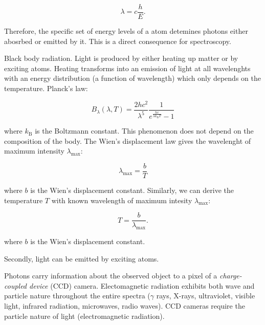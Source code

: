 \begin{equation}
	\lambda = c \frac{h}{E}.
\end{equation}

Therefore, the specific set of energy levels of a atom detemines photons either abosrbed or emitted by it.
This is a direct consequence for spectroscopy.~\cite{cochard2018}

Black body radiation.
Light is produced by either heating up matter or by exciting atoms.
Heating transforms into an emission of light at all wavelenghts with an energy distribution (a function of wavelength) which only depends on the temperature.
Planck's law:

\begin{equation}
	B_{\lambda}(\lambda, T) = \frac{2 h c^2}{\lambda^5} \frac{1}{e^{\frac{hc}{\lambda k_{\mathrm{B}}T}} - 1}
\end{equation}

where \(k_{\mathrm{B}}\) is the Boltzmann constant.
This phenomenon does not depend on the composition of the body.
The Wien's displacement law gives the wavelenght of maximum intensity \(\lambda_{\max}\):

\begin{equation}
	\lambda_{\max} = \frac{b}{T}
\end{equation}

where \(b\) is the Wien's displacement constant.
Similarly, we can derive the temperature \(T\) with known wavelength of maximum intesity \(\lambda_{\max}\):

\begin{equation}
	T = \frac{b}{\lambda_{\max}}.
\end{equation}

where \(b\) is the Wien's displacement constant.~\cite{cochard2018}

Secondly, light can be emitted by exciting atoms.

Photons carry information about the observed object to a pixel of a \textit{charge-coupled device} (CCD) camera.
Electomagnetic radiation exhibits both wave and particle nature throughout the entire spectra
(\(\gamma\) rays, X-rays, ultraviolet, visible light, infrared radiation, microwaves, radio waves).
CCD cameras require the particle nature of light (electromagnetic radiation).~\cite{trypsteen2017}


